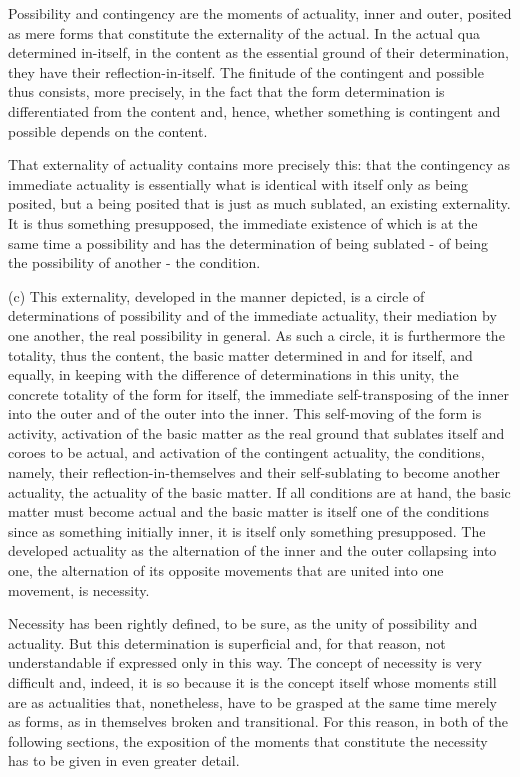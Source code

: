 Possibility and contingency are the moments of actuality, inner and outer,
posited as mere forms that constitute the externality of the actual.
In the actual qua determined in-itself,
in the content as the essential ground of their determination,
they have their reflection-in-itself.
The finitude of the contingent and possible thus consists,
more precisely, in the fact that the form determination is
differentiated from the content and, hence,
whether something is contingent and possible depends on the content.

That externality of actuality contains more precisely this:
that the contingency as immediate actuality is
essentially what is identical with itself only as being posited,
but a being posited that is just as much sublated,
 an existing externality.
It is thus something presupposed,
the immediate existence of which is
at the same time a possibility and has the determination of being sublated -
of being the possibility of another - the condition.

(c) This externality, developed in the manner depicted, is
a circle of determinations of possibility and of the immediate
actuality, their mediation by one another,
the real possibility in general.
As such a circle, it is furthermore the totality,
thus the content, the basic matter determined in
and for itself, and equally, in keeping with the difference of determinations
in this unity, the concrete totality of the form for itself,
the immediate self-transposing of the inner into the outer
and of the outer into the inner.
This self-moving of the form is activity,
activation of the basic matter as the real ground
that sublates itself and coroes to be actual,
and activation of the contingent actuality, the conditions,
namely, their reflection-in-themselves and their self-sublating
to become another actuality,  the actuality of the basic matter.
If all conditions are at hand, the basic matter must become actual
and the basic matter is itself one of the conditions
since as something initially inner,
it is itself only something presupposed.
The developed actuality as the alternation
of the inner and the outer collapsing into one,
the alternation of its opposite movements
that are united into one movement, is necessity.

    Necessity has been rightly defined, to be sure,
    as the unity of possibility and actuality.
    But this determination is superficial
    and, for that reason, not understandable
    if expressed only in this way.
    The concept of necessity is very difficult
    and, indeed, it is so because it is the concept itself
    whose moments still are as actualities that,
    nonetheless, have to be grasped at the same time merely as forms,
    as in themselves broken and transitional.
    For this reason, in both of the following sections,
    the exposition of the moments that
    constitute the necessity has to be given
    in even greater detail.

